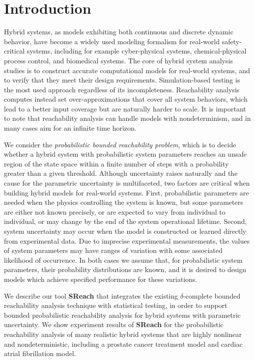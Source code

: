 \section{Introduction} 
\vspace{-.2cm} 
Hybrid systems, as models exhibiting both continuous and discrete dynamic behavior, have become 
a widely used modeling formalism for real-world safety-critical systems,
including for example cyber-physical systems, chemical-physical process control, and biomedical systems. 
The core of hybrid system analysis studies is to construct accurate computational models for real-world systems, 
and to verify that they meet their design requirements. Simulation-based testing 
is the most used approach regardless of its incompleteness. Reachability analysis computes instead set over-approximations that
cover all system behaviors, which lead to a better input coverage but are naturally harder to scale.
It is important to note that reachability analysis can handle models with nondeterminism, and in many cases aim for an infinite time horizon.

We consider the {\em probabilistic bounded reachability problem}, which is to decide whether
a hybrid system with probabilistic system parameters reaches an unsafe region of the
state space within a finite number of steps with a probability greater than a given threshold.
Although uncertainty raises naturally and the cause for the parametric uncertainty is multifaceted, two factors 
are critical when building hybrid models for real-world systems. 
First, probabilistic parameters are needed when the physics controlling the system is known, but some 
parameters are either not known precisely, or are expected to vary from individual to individual, 
or may change by the end of the system operational lifetime. 
Second, system uncertainty may occur when the model is constructed or learned directly from experimental data. 
Due to imprecise experimental measurements, the values of system parameters may have ranges of variation 
with some associated likelihood of occurrence. 
In both cases we assume that, for probabilistic system parameters, their probability distributions
are known, and it is desired to design models which achieve specified performance for these variations.   

We describe our tool {\bf SReach} that integrates the existing $\delta$-complete bounded 
reachability analysis technique \cite{gaodelta} with statistical testing, in order
to support bounded probabilistic reachability analysis for hybrid systems with parametric uncertainty. 
We show experiment results of {\bf SReach} for the probabilistic reachability analysis of many realistic hybrid systems that are highly nonlinear and nondeterministic, including a prostate cancer treatment model and cardiac atrial fibrillation model. 

